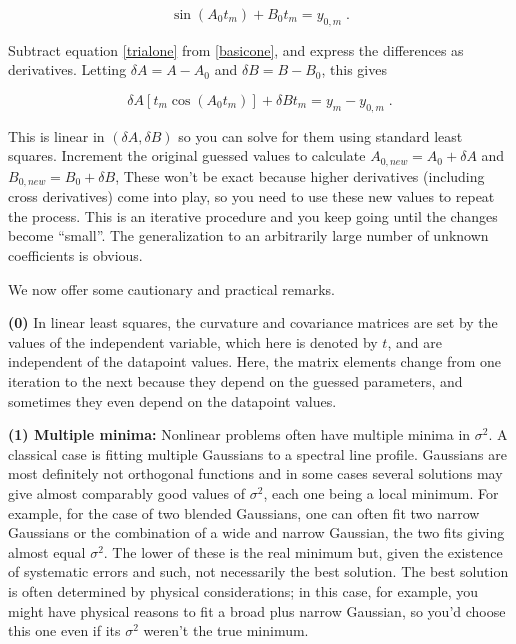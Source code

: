 \documentclass[psfig,preprint]{aastex}
\begin{document}
\begin{equation} \label{trialone}
\sin(A_0 t_m) + B_0 t_m = y_{0,m} \; .
\end{equation}

\noindent Subtract equation \ref{trialone} from \ref{basicone}, and
express the differences as derivatives. Letting $\delta A = A - A_0$ and
$\delta B = B - B_0$, this gives

\begin{equation} \label{difference}
\delta A [t_m \cos(A_0 t_m)] + \delta B t_m = y_m - y_{0,m} \; .
\end{equation}

\noindent This is linear in $(\delta A, \delta B)$ so you can solve for
them using standard least squares. Increment the original guessed values
to calculate $A_{0,new}=A_0 + \delta A$ and $B_{0,new}=B_0 + \delta B$,
These won't be exact because higher derivatives (including cross
derivatives) come into play, so you need to use these new values to
repeat the process. This is an iterative procedure and you keep going
until the changes become ``small''. The generalization to an arbitrarily
large number of unknown coefficients is obvious.

	We now offer some cautionary and practical remarks.

	{\bf (0)} In linear least squares, the curvature and covariance
matrices are set by the values of the independent variable, which here
is denoted by $t$, and are independent of the datapoint values. Here,
the matrix elements change from one iteration to the next because they
depend on the guessed parameters, and sometimes they even depend on the
datapoint values. 

	{\bf (1) Multiple minima:} Nonlinear problems often have
multiple minima in $\sigma^2$. A classical case is fitting multiple
Gaussians to a spectral line profile. Gaussians are most definitely not
orthogonal functions and in some cases several solutions may give almost
comparably good values of $\sigma^2$, each one being a local minimum.
For example, for the case of two blended Gaussians, one can often fit
two narrow Gaussians  or the combination of a wide and narrow Gaussian,
the two fits giving almost equal $\sigma^2$. The lower of these is the
real minimum but, given the existence of systematic errors and such, not
necessarily the best solution. The best solution is often determined by
physical considerations; in this case, for example, you might have
physical reasons to fit a broad plus narrow Gaussian, so you'd choose
this one even if its $\sigma^2$ weren't the true minimum.
\end{document}
